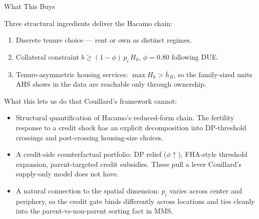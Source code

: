 \documentclass[11pt,aspectratio=169]{beamer}
\begin{document}
\begin{frame}{What This Buys}
\small

Three structural ingredients deliver the Hacamo chain:
\begin{enumerate}
\item Discrete tenure choice --- rent or own as distinct regimes.
\item Collateral constraint $b \geq (1-\phi)\,p_i\,H_k$, $\phi = 0.80$ following DUE.
\item Tenure-asymmetric housing services: $\max H_k > \bar h_R$, so the family-sized units AHS shows in the data are reachable only through ownership.
\end{enumerate}

\medskip
What this lets us do that Couillard's framework cannot:
\begin{itemize}
\item Structural quantification of Hacamo's reduced-form chain. The fertility response to a credit shock has an explicit decomposition into DP-threshold crossings and post-crossing housing-size choices.
\item A credit-side counterfactual portfolio: DP relief ($\phi \uparrow$), FHA-style threshold expansion, parent-targeted credit subsidies. These pull a lever Couillard's supply-only model does not have.
\item A natural connection to the spatial dimension: $p_i$ varies across center and periphery, so the credit gate binds differently across locations and ties cleanly into the parent-vs-non-parent sorting fact in MMS.
\end{itemize}

\end{frame}
\end{document}
